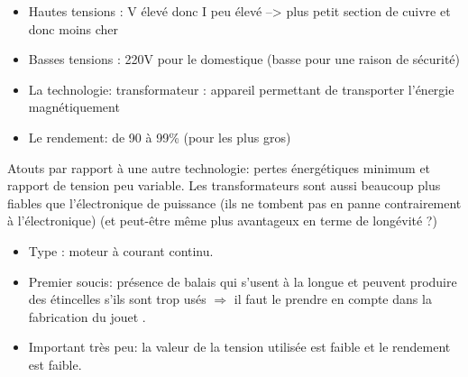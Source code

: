 \begin{questions}
\begin{solution}
\begin{itemize}
\item Hautes tensions : V élevé donc I peu élevé --> plus petit section de cuivre et donc moins cher
\item Basses tensions : 220V pour le domestique (basse pour une raison de sécurité)
\end{itemize}

\begin{itemize}
\item La technologie: transformateur : appareil permettant de transporter l'énergie magnétiquement
\item Le rendement: de 90 à 99\% (pour les plus gros)
\end{itemize}
Atouts par rapport à une autre technologie: pertes énergétiques minimum et rapport de tension peu variable. Les transformateurs sont aussi beaucoup plus fiables que l'électronique de puissance (ils ne tombent pas en panne contrairement à l'électronique) (et peut-être même plus avantageux en terme de longévité ?)
\end{solution}

\begin{solution}
\begin{itemize}
\item Type : moteur à courant continu.
\item Premier soucis: présence de balais qui s'usent à la longue et peuvent produire des étincelles s'ils sont trop usés $\Rightarrow$ il faut le prendre en compte dans la fabrication du jouet .
\item Important très peu: la valeur de la tension utilisée est faible et le rendement est faible.
\end{itemize}


\end{solution}
\end{questions}

